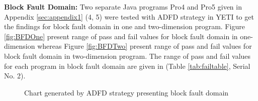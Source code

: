 \documentclass[runningheads,a4paper]{llncs}
\begin{document}


\noindent \textbf{Block Fault Domain:}  Two separate Java programs Pro4 and Pro5 given in Appendix \ref{sec:appendix1} (4, 5) were tested with ADFD strategy in YETI to get the findings for block fault domain in one and two-dimension program. Figure \ref{fig:BFDOne} present range of pass and fail values for block fault domain in one-dimension whereas Figure \ref{fig:BFDTwo} present range of pass and fail values for block fault domain in two-dimension program. The range of pass and fail values for each program in block fault domain are given in (Table \ref{tab:failtable}, Serial No. 2).





\begin{figure} [H]



\caption{Chart generated by ADFD strategy presenting block fault domain}
\end{figure}


\end{document}
